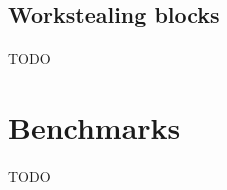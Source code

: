 \documentclass[a4paper, 11pt]{article}
\begin{document}
\subsection{Workstealing blocks}
\paragraph{}
TODO


%
\newpage
\section{Benchmarks}
\paragraph{}
TODO
\end{document}
